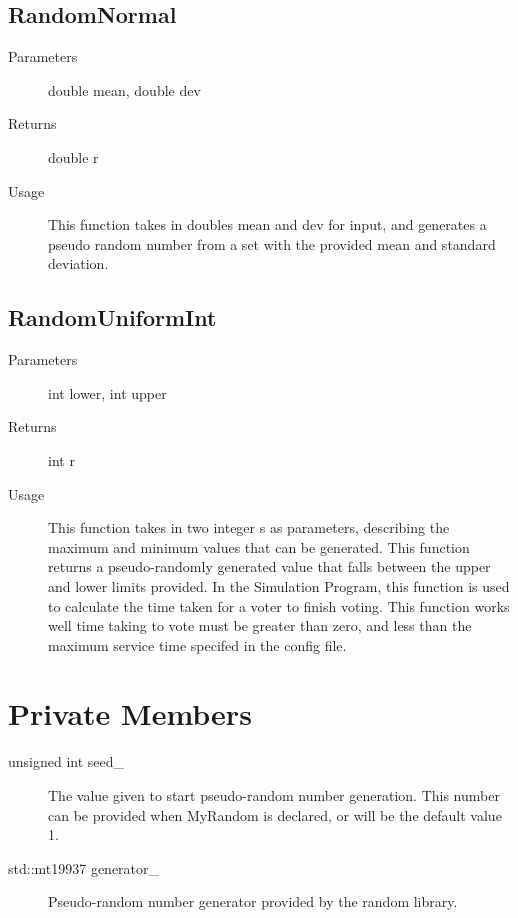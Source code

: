 \subsection{RandomNormal}
\begin{description}
\item[Parameters] double mean, double dev
\item[Returns] double r
\item[Usage] This function takes in doubles mean and dev for input, and generates a pseudo random number from a set with the provided mean and standard deviation.
\end{description}


\subsection{RandomUniformInt}
\begin{description}
\item[Parameters] int lower, int upper
\item[Returns] int r
\item[Usage] This function takes in two integer s as parameters, describing the maximum and minimum values that can be generated.  This function returns a pseudo-randomly generated value that falls between the upper and lower limits provided.
In the Simulation Program, this function is used to calculate the time taken for a voter to finish voting.  This function works well time taking to vote must be greater than zero, and less than the maximum service time specifed in the config file.
\end{description}



\section{Private Members}
\begin{description}
\item[unsigned int seed\_] The value given to start pseudo-random number generation.  This number can be provided when MyRandom is declared, or will be the default value 1.
\item[std::mt19937 generator\_] Pseudo-random number generator provided by the random library.
\end{description}


